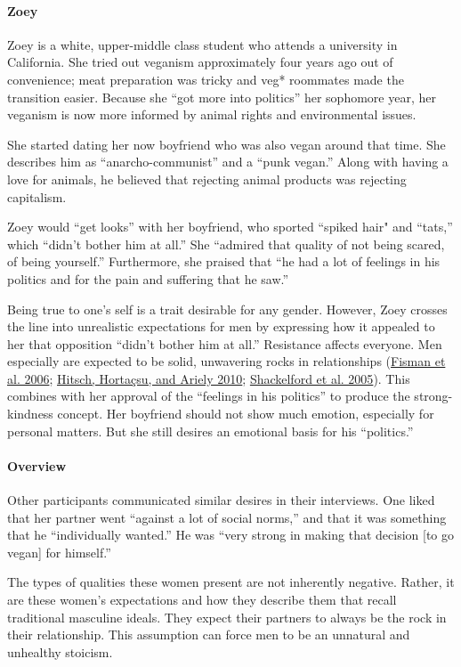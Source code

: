 \documentclass[twoside]{report}
\begin{document}
\paragraph{Zoey}

Zoey is a white, upper-middle class student who attends a university in California. She tried out veganism approximately four years ago out of convenience; meat preparation was tricky and veg* roommates made the transition easier. Because she ``got more into politics'' her sophomore year, her veganism is now more informed by animal rights and environmental issues.

She started dating her now boyfriend who was also vegan around that time. She describes him as ``anarcho-communist'' and a ``punk vegan.'' Along with having a love for animals, he believed that rejecting animal products was rejecting capitalism.

Zoey would ``get looks'' with her boyfriend, who sported ``spiked hair" and ``tats,'' which ``didn't bother him at all.'' She ``admired that quality of not being scared, of being yourself.'' Furthermore, she praised that ``he had a lot of feelings in his politics and for the pain and suffering that he saw.''

Being true to one's self is a trait desirable for any gender. However, Zoey crosses the line into unrealistic expectations for men by expressing how it appealed to her that opposition ``didn't bother him at all.'' Resistance affects everyone. Men especially are expected to be solid, unwavering rocks in relationships (\hyperlink{fisman}{Fisman et al. 2006}; \hyperlink{hitsch2}{Hitsch, Hortaçsu, and Ariely 2010}; \hyperlink{shackelford}{Shackelford et al. 2005}). This combines with her approval of the ``feelings in his politics'' to produce the strong-kindness concept. Her boyfriend should not show much emotion, especially for personal matters. But she still desires an emotional basis for his ``politics.''

\paragraph{Overview}

Other participants communicated similar desires in their interviews. One liked that her partner went ``against a lot of social norms,'' and that it was something that he ``individually wanted.'' He was ``very strong
in making that decision {[}to go vegan{]} for himself.''

The types of qualities these women present are not inherently negative. Rather, it are these women's expectations and how they describe them that recall traditional masculine ideals. They expect their partners to always be the rock in their relationship. This assumption can force men
to be an unnatural and unhealthy stoicism.
\end{document}
